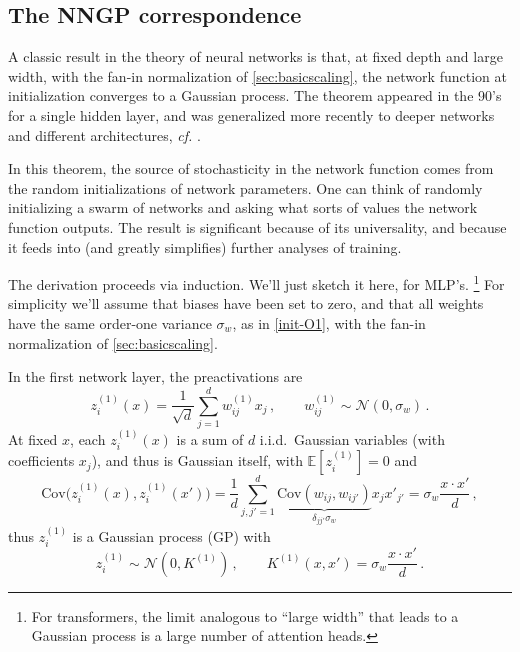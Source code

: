 \documentclass[11pt]{article}
\newcommand{\E}{\mathbb{E}}
\newcommand{\CN}{{\mathcal N}}
\begin{document}
\subsection{The NNGP correspondence}
\label{sec:NNGP}

A classic result in the theory of neural networks is that, at fixed depth and large width, with the fan-in normalization of \cref{sec:basicscaling}, the network function at initialization converges to a Gaussian process. The theorem appeared in the 90's \cite{neal1996bayesian} for a single hidden layer, and was generalized more recently to deeper networks and different architectures, \emph{cf.} \cite{lee2018deep, yang2019tensorprograms1, hanin2023random}.

In this theorem, the source of stochasticity in the network function comes from the random initializations of network parameters. One can think of randomly initializing a swarm of networks and asking what sorts of values the network function outputs. The result is significant because of its universality, and because it feeds into (and greatly simplifies) further analyses of training.

The derivation proceeds via induction. We'll just sketch it here, for MLP's.%
%
\footnote{For transformers, the limit analogous to ``large width'' that leads to a Gaussian process is a large number of attention heads.} %
%
For simplicity we'll assume that biases have been set to zero, and that all weights have the same order-one variance $\sigma_w$, as in \eqref{init-O1}, with the fan-in normalization of \cref{sec:basicscaling}.

In the first network layer, the preactivations are
%
\begin{equation}
    z_i^{(1)}(x) = \frac{1}{\sqrt d}\sum_{j=1}^d w_{ij}^{(1)}x_j\,,\qquad w_{ij}^{(1)}\sim \CN(0,\sigma_w)\,.
\end{equation}
%
At fixed $x$, each $z_i^{(1)}(x)$ is a sum of $d$ i.i.d.\ Gaussian variables (with coefficients $x_j$), and thus is Gaussian itself, with $\E[z_i^{(1)}] = 0$ and
%
\begin{equation} \text{Cov}\big(z_i^{(1)}(x),z_i^{(1)}(x')\big) = \frac{1}{d}\sum_{j,j'=1}^d \underbrace{\text{Cov}(w_{ij},w_{ij'})}_{\delta_{jj'} \sigma_w}x_j x'_{j'}  = \sigma_w\frac{x\cdot x'}{d}\,,
\end{equation}  
%
thus $z_i^{(1)}$ is a Gaussian process (GP) with
%
\begin{equation} z_i^{(1)} \sim \CN(0,K^{(1)})\,,\qquad K^{(1)}(x,x') = \sigma_w\frac{x\cdot x'}{d}\,. \end{equation}
\end{document}
